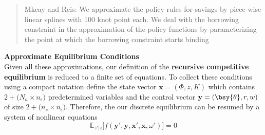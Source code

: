 \documentclass[a4paper,11pt]{article}  %
\begin{document}
\begin{quote}
   Mkcay and Reis: We approximate the policy rules for savings by piece-wise linear splines with
   100 knot point each. We deal with the borrowing constraint in the approximation of the policy
   functions by parameterizing the point at which the borrowing constraint starts binding
\end{quote}

\textbf{Approximate Equilibrium Conditions} \\ Given all these approximations, our definition of the
\textbf{recursive competitive equilibrium} is reduced to a finite set of equations.
To collect these conditions using a compact notation define the state vector $ \mathbf{x} = (\Phi,z, K ) $ which contains
$2 + \big(N_a \times n_{\epsilon} \big)$
predetermined variables
and the control vector $ \mathbf{y} = ( \bsy{\theta}, r, w )  $ of size
$2 +\big(n_s \times n_{\epsilon}\big)$.
Therefore, the our discrete equilibrium can be resumed by a system of nonlinear equations
\begin{equation}
   \label{eq:SYSTEM}
   \mathbb{E}_{z'|z} \Big[ f(\mathbf{y}',\mathbf{y},\mathbf{x}',\mathbf{x}, \omega') \Big] = 0
\end{equation}
\end{document}
